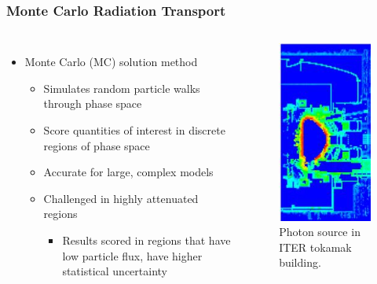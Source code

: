 \documentclass{beamer}
\begin{document}
\begin{frame}
\frametitle{Monte Carlo Radiation Transport}
\begin{columns}
\begin{itemize}
	\item{Monte Carlo (MC) solution method \cite{mcnp_manual}}%
	\begin{itemize}
		\item{Simulates random particle walks through phase space}
	        \item{Score quantities of interest 
		in discrete regions of phase space}
		\item{Accurate for large, complex models}
		\item{Challenged in highly attenuated regions}
                  \begin{itemize}
                  \item{Results scored in regions that have low particle flux, have higher statistical uncertainty}
                  \end{itemize}
	\end{itemize}
\end{itemize}

\begin{figure}
	\centering
	\includegraphics[scale=0.5]{iter_pflux.jpg}
	\caption{Photon source in ITER tokamak building.}
\end{figure}

\end{columns}
\end{frame}
\end{document}
